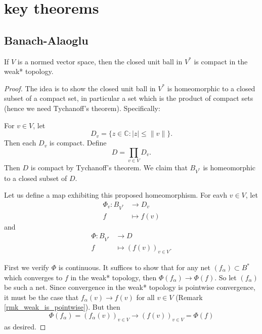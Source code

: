 \documentclass[12pt]{article}
\begin{document}
\section{key theorems} %
\begin{refsection}

\subsection{Banach-Alaoglu} %

\begin{theorem}
\label{thm_banach_alaoglu}
	If $V$ is a normed vector space, then the closed unit ball in $V^\ast$ is compact in the weak* topology.
\end{theorem}
\begin{proof}
	The idea is to show the closed unit ball in $V^\ast$ is homeomorphic to a closed subset of a compact set, in particular a set which is the product of compact sets (hence we need Tychanoff's theorem). Specifically:

	For $v\in V$, let 
	\begin{equation*}
		D_v = \{z\in\mathbb{C} : |z| \leq \|v\|\}.
	\end{equation*}
	Then each $D_v$ is compact. Define 
	\begin{equation*}
		D = \prod_{v\in V} D_v.
	\end{equation*}
	Then $D$ is compact by Tychanoff's theorem. We claim that $B_{V^\ast}$ is homeomorphic to a closed subset of $D$.

	Let us define a map exhibiting this proposed homeomorphism. For eavh $v\in V$, let
	\begin{align*}
		\Phi_v: B_{V^\ast} &\to D_v \\
		f &\mapsto f(v)
	\end{align*}
	and 
	\begin{align*}
		\Phi: B_{V^\ast} &\to D \\
		f &\mapsto (f(v))_{v\in V}.
	\end{align*}

	First we verify $\Phi$ is continuous. It suffices to show that for any net $(f_{\alpha}) \subset B^\ast$ which converges to $f$ in the weak* topology, then $\Phi(f_{\alpha})\to \Phi(f)$. So let $(f_\alpha)$ be such a net. Since convergence in the weak* topology is pointwise convergence, it must be the case that $f_\alpha(v) \to f(v)$ for all $v\in V$ (Remark \ref{rmk_weak_is_pointwise}). But then 
	\begin{equation*}
		\Phi(f_\alpha) = (f_\alpha(v))_{v\in V} \to (f(v))_{v\in V} = \Phi(f)
	\end{equation*}
	as desired.


\end{proof}
\end{refsection}
\end{document}
